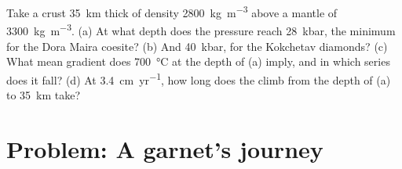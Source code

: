 \begin{exercise}[$\star\star\star$]\label{exo:b2:pt-paths:12}
Take a crust \qty{35}{km} thick of density \qty{2800}{kg.m^{-3}} above a mantle of
\qty{3300}{kg.m^{-3}}. (a) At what depth does the pressure reach \qty{28}{kbar}, the
minimum for the Dora Maira coesite? (b) And \qty{40}{kbar}, for the Kokchetav diamonds?
(c) What mean gradient does \qty{700}{\celsius} at the depth of (a) imply, and in which
series does it fall? (d) At \qty{3.4}{cm.yr^{-1}}, how long does the climb from the depth
of (a) to \qty{35}{km} take?
\end{exercise}

\section{Problem: A garnet's journey}


